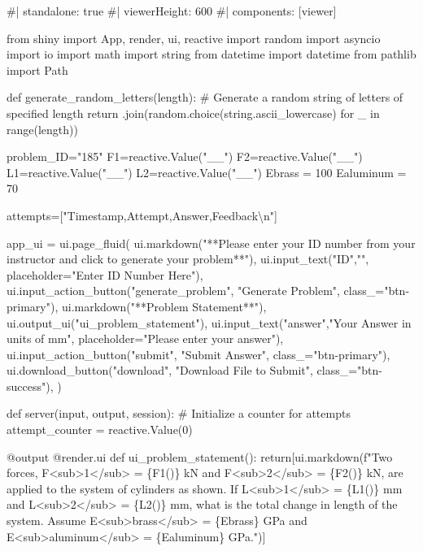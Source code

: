 \documentclass[
  letterpaper,
  DIV=11,
  numbers=noendperiod]{scrreprt}
\newenvironment{Shaded}{\begin{snugshade}}{\end{snugshade}}
\newcommand{\NormalTok}[1]{\textcolor[rgb]{0.00,0.23,0.31}{#1}}
\begin{document}
\begin{Shaded}
\begin{Highlighting}[]
\NormalTok{\#| standalone: true}
\NormalTok{\#| viewerHeight: 600}
\NormalTok{\#| components: [viewer]}

\NormalTok{from shiny import App, render, ui, reactive}
\NormalTok{import random}
\NormalTok{import asyncio}
\NormalTok{import io}
\NormalTok{import math}
\NormalTok{import string}
\NormalTok{from datetime import datetime}
\NormalTok{from pathlib import Path}

\NormalTok{def generate\_random\_letters(length):}
\NormalTok{    \# Generate a random string of letters of specified length}
\NormalTok{    return \textquotesingle{}\textquotesingle{}.join(random.choice(string.ascii\_lowercase) for \_ in range(length))}

\NormalTok{problem\_ID="185"}
\NormalTok{F1=reactive.Value("\_\_")}
\NormalTok{F2=reactive.Value("\_\_")}
\NormalTok{L1=reactive.Value("\_\_")}
\NormalTok{L2=reactive.Value("\_\_")}
\NormalTok{Ebrass = 100}
\NormalTok{Ealuminum = 70}



\NormalTok{attempts=["Timestamp,Attempt,Answer,Feedback\textbackslash{}n"]}

\NormalTok{app\_ui = ui.page\_fluid(}
\NormalTok{    ui.markdown("**Please enter your ID number from your instructor and click to generate your problem**"),}
\NormalTok{    ui.input\_text("ID","", placeholder="Enter ID Number Here"),}
\NormalTok{    ui.input\_action\_button("generate\_problem", "Generate Problem", class\_="btn{-}primary"),}
\NormalTok{    ui.markdown("**Problem Statement**"),}
\NormalTok{    ui.output\_ui("ui\_problem\_statement"),}
\NormalTok{    ui.input\_text("answer","Your Answer in units of mm", placeholder="Please enter your answer"),}
\NormalTok{    ui.input\_action\_button("submit", "Submit Answer", class\_="btn{-}primary"),}
\NormalTok{    ui.download\_button("download", "Download File to Submit", class\_="btn{-}success"),}
\NormalTok{)}


\NormalTok{def server(input, output, session):}
\NormalTok{    \# Initialize a counter for attempts}
\NormalTok{    attempt\_counter = reactive.Value(0)}

\NormalTok{    @output}
\NormalTok{    @render.ui}
\NormalTok{    def ui\_problem\_statement():}
\NormalTok{        return[ui.markdown(f"Two forces, F\textless{}sub\textgreater{}1\textless{}/sub\textgreater{} = \{F1()\} kN and F\textless{}sub\textgreater{}2\textless{}/sub\textgreater{} = \{F2()\} kN, are applied to the system of cylinders as shown. If L\textless{}sub\textgreater{}1\textless{}/sub\textgreater{} = \{L1()\} mm and L\textless{}sub\textgreater{}2\textless{}/sub\textgreater{} = \{L2()\} mm, what is the total change in length of the system. Assume E\textless{}sub\textgreater{}brass\textless{}/sub\textgreater{} = \{Ebrass\} GPa and E\textless{}sub\textgreater{}aluminum\textless{}/sub\textgreater{} = \{Ealuminum\} GPa.")]}
    

\end{Highlighting}
\end{Shaded}
\end{document}
